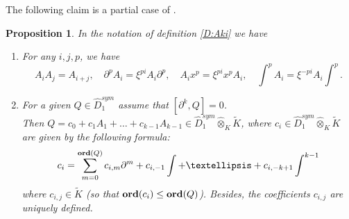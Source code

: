 \documentclass[11pt]{article}
\theoremstyle{definition}
\newcommand{\Ord}{\mathop {\rm \bf ord}}
\theoremstyle{plain}
\newtheorem{Prop}{Proposition}[section]
\numberwithin{equation}{section}
\begin{document}
The following claim is a partial case of \cite[Prop. 7.1]{A.Z}.

\begin{Prop}
	\label{T:A.Z 7.1}
	In the notation of definition \ref{D:Aki} we have 
	\begin{enumerate}
		\item For any $i,j,p$, we have
	$$A_{i} A_{j}=A_{i+j}, \quad \partial^{p}A_{i}=\xi^{pi}A_{i}\partial^{p}, \quad A_{i}x^{p}=\xi^{pi}x^{p}A_{i},\quad \int^{p}A_{i}=\xi^{-pi}A_{i}\int^{p}.$$
		\item For a given $Q \in  \hat{D}^{sym}_{1} $ assume that $[\partial^{k},Q]=0 $. 
		\\Then $Q=c_{0}+c_{1}A_{1}+\dots+c_{k-1}A_{k-1}\in  \hat{D}^{sym}_{1}\hat{\otimes}_{K}\tilde{K}$, where $c_{i}\in  \hat{D}^{sym}_{1}\hat{\otimes}_{K}\tilde{K}$ are given by the following formula:
		$$c_{i}=\sum_{m=0}^{\Ord (Q)}c_{i,m}\partial^{m}+c_{i,-1}\int+\dots+c_{i,-k+1}\int^{k-1} $$ 
		where $c_{i,j}\in \tilde{K}$ (so that $\Ord(c_{i})\le \Ord(Q)$). Besides, the coefficients $c_{i,j}$ are uniquely defined.
	\end{enumerate}
	
\end{Prop}
\end{document}

